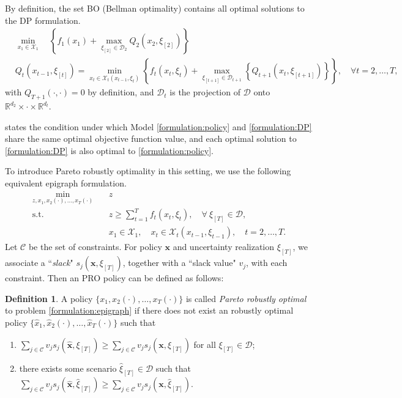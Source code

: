 \documentclass[10pt]{article}
\theoremstyle{plain}
\theoremstyle{definition}
\newtheorem{definition}{Definition}
\theoremstyle{remark}
\newcommand{\mcal}{\mathcal}
\newcommand{\subjectto}{\text{s.t.}}
\newcommand{\bx}{\mathbf{x}}
\newcommand{\R}{\mathbb{R}}
\begin{document}
By definition, the set BO (Bellman optimality) contains all optimal 
solutions to the DP formulation.
\begin{subequations}\label{formulation:DP}
\begin{align}
& \min_{x_1\in \mcal{X}_1}\quad \left\{f_1(x_1) + \max_{\xi_{[2]}\in \mcal{D}_2} Q_2(x_2, \xi_{[2]})\right\}\\
& Q_{t}(x_{t-1},\xi_{[t]}) = \min_{x_t\in \mcal{X}_{t}(x_{t-1},\xi_t)}\left\{ f_t(x_t,\xi_t) + \max_{\xi_{[t+1]}\in \mcal{D}_{t+1}} \left\{Q_{t+1}(x_t, \xi_{[t+1]}) \right\} \right\}, \quad \forall t=2,\ldots, T,
\end{align}
\end{subequations}
with $Q_{T+1}(\cdot,\cdot) = 0$ by definition,
and $\mcal{D}_t$ is the projection of $\mcal{D}$ onto $\R^{d_2}\times\cdot\times \R^{d_t}$.

{\color{blue}
	\citet{shapiro2011dynamic} states the condition under which Model \eqref{formulation:policy} and \eqref{formulation:DP} share the same optimal objective function value, and each optimal solution to \eqref{formulation:DP} is also optimal to \eqref{formulation:policy}.
}

To introduce Pareto robustly optimality in this setting, we use the following
equivalent epigraph formulation.
\begin{subequations}\label{formulation:epigraph}
	\begin{align}
	\min_{z, x_1, x_2(\cdot), \ldots, x_T(\cdot)}\quad & z\\
	\subjectto \qquad\quad & z \ge \sum_{t=1}^{T}f_t(x_t,\xi_t),\quad \forall~\xi_{[T]}\in \mcal{D},\\
	& x_1\in \mcal{X}_1,\quad x_t\in \mcal{X}_t(x_{t-1},\xi_{t-1}), \quad t=2,\ldots, T.
	\end{align}
\end{subequations}
Let $\mcal{C}$ be the set of constraints.
For policy $\bx$ and uncertainty realization $\xi_{[T]}$, we associate a ``{\it slack}" $s_j(\bx,\xi_{[T]})$, together with a ``slack value" $v_j$,
with each constraint.
Then an PRO policy can be defined as follows:
\begin{definition}
	A policy $\{x_1, x_2(\cdot), \ldots, x_T(\cdot)\}$ is called
	\emph{Pareto robustly optimal} to problem \eqref{formulation:epigraph} if
	there does not exist an robustly optimal policy $\{\hat{x}_1, \hat{x}_2(\cdot), \ldots, \hat{x}_T(\cdot)\}$ such that
	\begin{enumerate}[topsep=0pt,noitemsep,label=(\roman*)]
		\item $\sum_{j\in \mcal{C}}v_js_j(\hat{\bx},\xi_{[T]}) \ge \sum_{j\in \mcal{C}}v_js_j(\bx,\xi_{[T]})$
		for all $\xi_{[T]}\in \mcal{D}$;
		\item there exists some scenario $\hat{\xi}_{[T]}\in \mcal{D}$ such that
		$\sum_{j\in \mcal{C}}v_js_j(\hat{\bx},\hat{\xi}_{[T]}) \ge \sum_{j\in \mcal{C}}v_js_j(\bx,\hat{\xi}_{[T]})$.
	\end{enumerate}
\end{definition}
\end{document}
